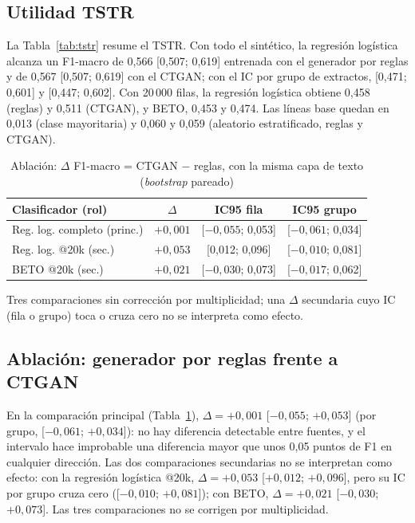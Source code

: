 \documentclass[journal]{IEEEtai}
\begin{document}
\subsection{Utilidad TSTR}
La Tabla~\ref{tab:tstr} resume el TSTR. Con todo el sintético, la regresión logística alcanza un F1-macro de 0{,}566 [0{,}507; 0{,}619] entrenada con el generador por reglas y de 0{,}567 [0{,}507; 0{,}619] con el CTGAN; con el IC por grupo de extractos, [0{,}471; 0{,}601] y [0{,}447; 0{,}602]. Con 20\,000 filas, la regresión logística obtiene 0{,}458 (reglas) y 0{,}511 (CTGAN), y BETO, 0{,}453 y 0{,}474. Las líneas base quedan en 0{,}013 (clase mayoritaria) y 0{,}060 y 0{,}059 (aleatorio estratificado, reglas y CTGAN).

\begin{table}[!t]
\caption{Ablación: $\Delta$ F1-macro = CTGAN $-$ reglas, con la misma capa de texto (\textit{bootstrap} pareado)}
\label{tab:ablacion}
\centering
\footnotesize
\setlength{\tabcolsep}{3.5pt}
\begin{tabular}{lccc}
\toprule
Clasificador (rol) & $\Delta$ & IC95 fila & IC95 grupo \\
\midrule
Reg. log. completo (princ.) & $+0{,}001$ & [$-0{,}055$; 0{,}053] & [$-0{,}061$; 0{,}034] \\
Reg. log. @20k (sec.) & $+0{,}053$ & [0{,}012; 0{,}096] & [$-0{,}010$; 0{,}081] \\
BETO @20k (sec.) & $+0{,}021$ & [$-0{,}030$; 0{,}073] & [$-0{,}017$; 0{,}062] \\
\bottomrule
\end{tabular}
\par\smallskip\footnotesize Tres comparaciones sin corrección por multiplicidad; una $\Delta$ secundaria cuyo IC (fila o grupo) toca o cruza cero no se interpreta como efecto.
\end{table}

\subsection{Ablación: generador por reglas frente a CTGAN}
En la comparación principal (Tabla~\ref{tab:ablacion}), $\Delta=+0{,}001$ [$-0{,}055$; $+0{,}053$] (por grupo, [$-0{,}061$; $+0{,}034$]): no hay diferencia detectable entre fuentes, y el intervalo hace improbable una diferencia mayor que unos 0{,}05 puntos de F1 en cualquier dirección. Las dos comparaciones secundarias no se interpretan como efecto: con la regresión logística @20k, $\Delta=+0{,}053$ [$+0{,}012$; $+0{,}096$], pero su IC por grupo cruza cero ([$-0{,}010$; $+0{,}081$]); con BETO, $\Delta=+0{,}021$ [$-0{,}030$; $+0{,}073$]. Las tres comparaciones no se corrigen por multiplicidad.
\end{document}
